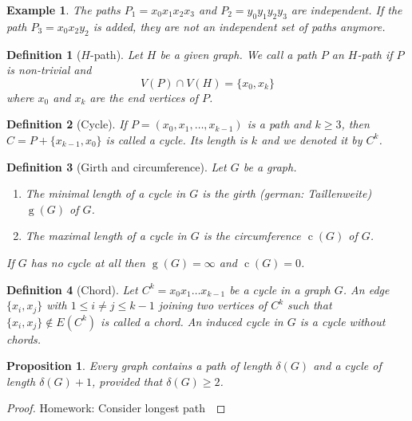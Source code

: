\documentclass[a4paper]{article}
\newcounter{cnt} \numberwithin{cnt}{section}
\newtheorem*{defi*}{Definition}
\newtheorem*{ex}{Example}
\newtheorem{prop}[cnt]{Proposition}
\DeclareMathOperator{\girth}{g}
\DeclareMathOperator{\circum}{c}
\begin{document}
\begin{ex}
  The paths $P_1 = x_0 x_1 x_2 x_3$ and $P_2 = y_0 y_1 y_2 y_3$ are independent. If the path $P_3 = x_0 x_2 y_2$ is added, they are not an independent set of paths anymore.
\end{ex}

\begin{defi*}[$H$-path]
  Let $H$ be a given graph. We call a path $P$ an \emph{$H$-path} if $P$ is non-trivial and
  \[ V(P) \cap V(H) = \{x_0,x_k\} \]
  where $x_0$ and $x_k$ are the end vertices of $P$.
\end{defi*}

\begin{defi*}[Cycle]
  If $P = (x_0,x_1,\dots,x_{k-1})$ is a path and $k \geq 3$, then $C = P + \{x_{k-1},x_{0} \}$ is called a cycle.
  Its length is $k$ and we denoted it by $C^k$.
\end{defi*}

\begin{defi*}[Girth and circumference]
  Let $G$ be a graph.
  \begin{enumerate}[label=(\alph*)]
    \item The minimal length of a cycle in $G$ is the \emph{girth} (german: Taillenweite) $\girth(G)$ of $G$.
    \item The maximal length of a cycle in $G$ is the \emph{circumference} $\circum(G)$  of $G$.
  \end{enumerate}
  If $G$ has no cycle at all then $\girth(G) = \infty$ and $\circum(G) = 0$.\\
\end{defi*}

\begin{defi*}[Chord]
  Let $C^k = x_0 x_1 \dots x_{k-1}$ be a cycle in a graph $G$.
  An edge $\{x_i,x_j\}$ with $1 \leq i \neq j \leq k-1$ joining two vertices of $C^k$ such that $\{x_i,x_j\} \notin E(C^k)$ is called a \emph{chord}.
  An induced cycle in $G$ is a cycle without chords.
\end{defi*}

\begin{prop}
  Every graph contains a path of length $\delta(G)$ and a cycle of length $\delta(G) +1$, provided that $\delta(G) \geq 2$.
\end{prop}

\begin{proof}
  Homework: Consider longest path\
\end{proof}
\end{document}
